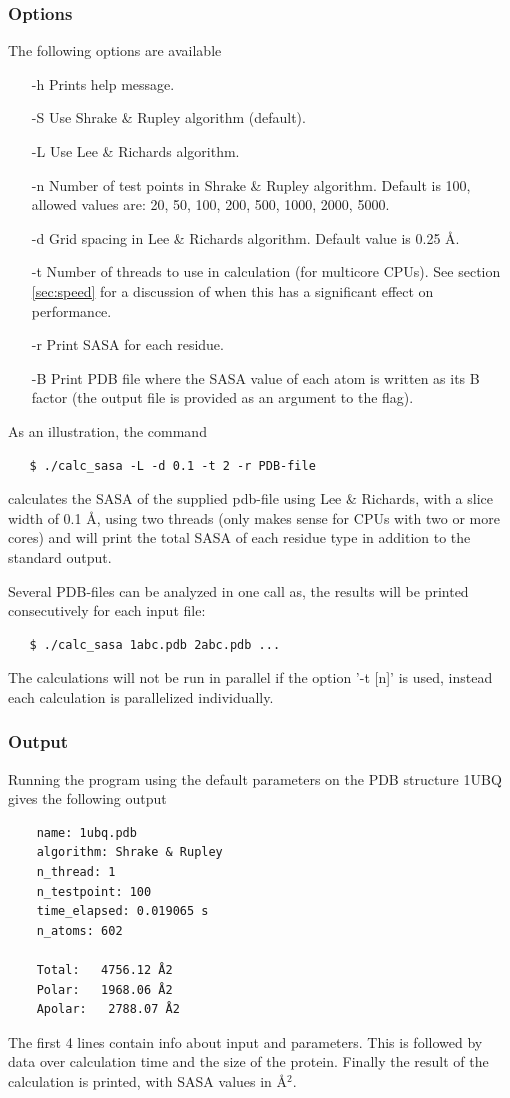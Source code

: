 \documentclass[a4paper,11pt]{article}
\begin{document}
\subsubsection{Options}
The following options are available
\begin{itemize}
  \item[-h] Prints help message.
  \item[-S] Use Shrake \& Rupley algorithm (default).
  \item[-L] Use Lee \& Richards algorithm.
  \item[-n] Number of test points in Shrake \& Rupley algorithm.
    Default is 100, allowed values are: 20, 50, 100, 200, 500, 1000,
    2000, 5000.
  \item[-d] Grid spacing in Lee \& Richards algorithm.
  Default value is 0.25 Å.
  \item[-t] Number of threads to use in calculation (for multicore
    CPUs). See section \ref{sec:speed} for a discussion of when this
    has a significant effect on performance.
  \item[-r] Print SASA for each residue.
  \item[-B] Print PDB file where the SASA value of each atom is
    written as its B factor (the output file is provided as an
    argument to the flag).
\end{itemize}
As an illustration, the command
\begin{verbatim}
   $ ./calc_sasa -L -d 0.1 -t 2 -r PDB-file
\end{verbatim}
calculates the SASA of the supplied pdb-file using Lee \& Richards,
with a slice width of 0.1 Å, using two threads (only makes sense for
CPUs with two or more cores) and will print the total SASA of each
residue type in addition to the standard output.

Several PDB-files can be analyzed in one call as, the results will be
printed consecutively for each input file:
\begin{verbatim}
   $ ./calc_sasa 1abc.pdb 2abc.pdb ...
\end{verbatim}
The calculations will not be run in parallel if the option '-t [n]' is
used, instead each calculation is parallelized individually.

\subsubsection{Output}
Running the program using the default parameters on the PDB structure
1UBQ gives the following output
\begin{verbatim}
    name: 1ubq.pdb
    algorithm: Shrake & Rupley
    n_thread: 1
    n_testpoint: 100
    time_elapsed: 0.019065 s
    n_atoms: 602

    Total:   4756.12 Å2
    Polar:   1968.06 Å2
    Apolar:   2788.07 Å2
\end{verbatim}
The first 4 lines contain info about input and parameters. This is
followed by data over calculation time and the size of the
protein. Finally the result of the calculation is printed, with SASA
values in Å$^2$.
\end{document}
